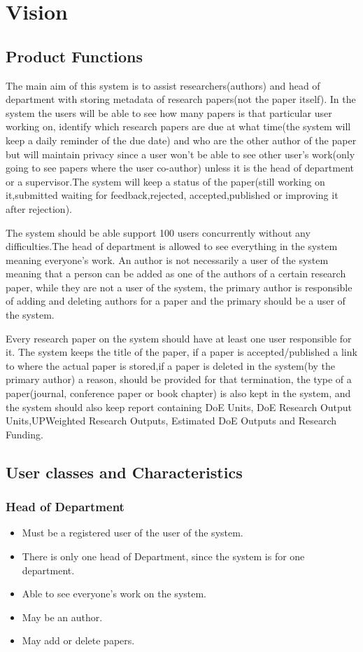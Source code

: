 \documentclass[a4paper,12pt]{report}
\begin{document}
\chapter{Vision}
\section{Product Functions}

The main aim of this system is to assist researchers(authors) and head of department with storing metadata of research papers(not the paper itself). In the system the users will be able to see how many papers is that particular user working on,  identify which research papers  are due at what time(the system will keep a daily reminder of the due date) and who are the other author of the paper but will maintain privacy since a user won't be able to see other user's work(only going to see papers where the user co-author) unless it is the head of department or a supervisor.The system will keep a status of the paper(still working on it,submitted waiting for feedback,rejected, accepted,published or improving it after rejection).

The system should be able support 100 users concurrently without any difficulties.The head of department is allowed to see everything in the system meaning everyone's work. An author is not necessarily a user of the system meaning that a person can be added as one of the authors of a certain research paper, while they are not a user of the system, the primary author is responsible of adding and deleting authors for a paper and the primary should be a user of the system.

Every research paper on the system should have at least one user responsible for it. The system keeps the title of the paper, if a paper is accepted/published a link to where the actual paper is stored,if a paper is deleted in the system(by the primary author) a reason, should be provided for that termination, the type of a paper(journal, conference paper or book chapter) is also kept in the system, and the system should also keep report containing DoE Units, DoE Research Output Units,UPWeighted Research Outputs, Estimated DoE Outputs and Research Funding.

\section{User classes and Characteristics}
\subsection{Head of Department}
\begin{itemize}
\item
Must be a registered user of the user of the system.
\item
There is only one head of Department, since the system is for one department.
\item
 Able to see everyone's work on the system.
\item
May be an author.
\item
May add or delete papers.

\end{itemize}
\end{document}
